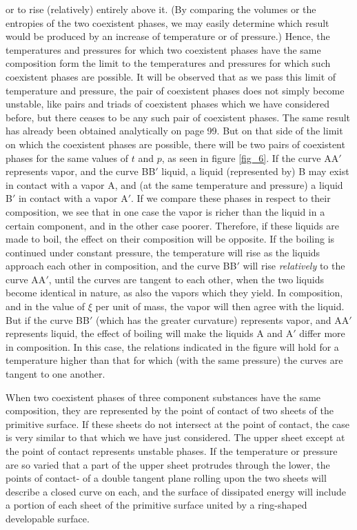 \documentclass[12pt]{memoir}
\begin{document}
or to rise (relatively) entirely above it. (By comparing the volumes or the entropies of the two coexistent phases, we may easily determine which result would be produced by an increase of temperature or of pressure.) Hence, the temperatures and pressures for which two coexistent phases have the same composition form the limit to the temperatures and pressures for which such coexistent phases are possible. It will be observed that as we pass this limit of temperature and pressure, the pair of coexistent phases does not simply become unstable, like pairs and triads of coexistent phases which we have considered before, but there ceases to be any such pair of coexistent phases. The same result has already been obtained analytically on page 99. But on that side of the limit on which the coexistent phases are possible, there will be two pairs of coexistent phases for the same values of $t$ and $p$, as seen in figure \ref{fig_6}. If the curve AA$'$ represents vapor, and the curve BB$'$ liquid, a liquid (represented by) B may exist in contact with a vapor A, and (at the same temperature and pressure) a liquid B$'$ in contact with a vapor A$'$. If we compare these phases in respect to their composition, we see that in one case the vapor is richer than the liquid in a certain component, and in the other case poorer. Therefore, if these liquids are made to boil, the effect on their composition will be opposite. If the boiling is continued under constant pressure, the temperature will rise as the liquids approach each other in composition, and the curve BB$'$ will rise \textit{relatively} to the curve AA$'$, until the curves are tangent to each other, when the two liquids become identical in nature, as also the vapors which they yield. In composition, and in the value of $\xi$ per unit of mass, the vapor will then agree with the liquid. But if the curve BB$'$ (which has the greater curvature) represents vapor, and AA$'$ represents liquid, the effect of boiling will make the liquids A and A$'$ differ more in composition. In this case, the relations indicated in the figure will hold for a temperature higher than that for which (with the same pressure) the curves are tangent to one another.


When two coexistent phases of three component substances have the same composition, they are represented by the point of contact of two sheets of the primitive surface. If these sheets do not intersect at the point of contact, the case is very similar to that which we have just considered. The upper sheet except at the point of contact represents unstable phases. If the temperature or pressure are so varied that a part of the upper sheet protrudes through the lower, the points of contact- of a double tangent plane rolling upon the two sheets will describe a closed curve on each, and the surface of dissipated energy will include a portion of each sheet of the primitive surface united by a ring-shaped developable surface.
\end{document}
